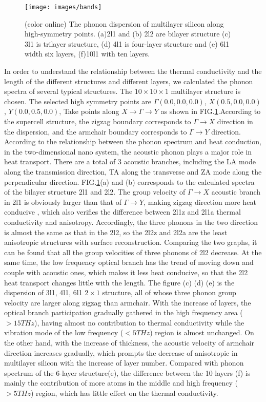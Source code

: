 \documentclass[%
 reprint,
 amsmath,amssymb,
 aps,
 prb,
]{revtex4-1}
\begin{document}
\begin{figure}[b]
  \texttt{[image: images/bands]}
  \caption{\label{fig:bands}(color online) The phonon dispersion of multilayer silicon along high-symmetry points. (a)2l1 and (b) 2l2 are bilayer structure (c) 3l1 is trilayer structure, (d) 4l1 is four-layer structure and (e) 6l1 width six layers, (f)10l1 with ten layers.}
\end{figure}

In order to understand the relationship between the thermal conductivity and the length of the different structures and different layers, we calculated the phonon spectra of several typical structures. The $10 \times  10  \times  1$ multilayer structure is chosen. The selected high symmetry points are $\Gamma(0.0, 0.0, 0.0)$, $X(0.5, 0.0, 0.0)$,  $Y(0.0, 0.5, 0.0)$, Take points along $ X \rightarrow \Gamma \rightarrow Y$ as shown in FIG.\ref{fig:bands}.According to the supercell structure, the zigzag boundary corresponds to $ \Gamma \rightarrow X$ direction in the dispersion, and the armchair boundary corresponds to $\Gamma\rightarrow Y$ direction. According to the relationship between the phonon spectrum and heat conduction, in the two-dimensional nano system, the acoustic phonon plays a major role in heat transport. There are a total of 3 acoustic branches, including the LA mode along the transmission direction, TA along the transverse and ZA mode along the perpendicular direction. FIG.\ref{fig:bands}(a) and (b) corresponds to the calculated spectra of the bilayer structure 2l1 and 2l2. The group velocity of $\Gamma\rightarrow X$ acoustic branch in 2l1 is obviously larger than that of $\Gamma\rightarrow Y$, making zigzag direction more heat conducive , which also verifies the difference between 2l1z and 2l1a thermal conductivity and anisotropy. Accordingly, the three phonons in the two direction is almost the same as that in the 2l2, so the 2l2z and 2l2a are the least anisotropic structures with surface reconstruction. Comparing the two graphs, it can be found that all the group velocities of three phonons of 2l2 decrease. At the same time, the low frequency optical branch has the trend of moving down and couple with acoustic ones, which makes it less heat conducive, so that the 2l2 heat transport changes little with the length. The figure (c) (d) (e) is the dispersion of 3l1, 4l1, 6l1 $2 \times 1$ structure, all of whose three phonon group velocity are larger along zigzag than armchair. With the increase of layers, the optical branch participation gradually gathered in the high frequency area ($>15THz$), having almost no contribution to thermal conductivity while the vibration mode of the low frequency ($<5THz$) region is almost unchanged. On the other hand, with the increase of thickness, the acoustic velocity of armchair direction increases gradually, which prompts the decrease of anisotropic in multilayer silicon with the increase of layer number. Compared with phonon spectrum of the 6-layer structure(e), the difference between the 10 layers (f) is mainly the contribution of more atoms in the middle and high frequency ($>5THz$) region, which has little effect on the thermal conductivity.
\end{document}
